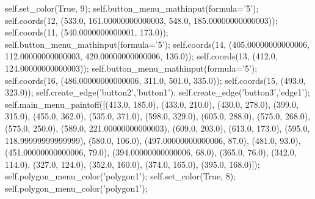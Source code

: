 self.set_color(True, 9);
self.button_menu_mathinput(formula='5');
self.coords(12, (533.0, 161.00000000000003, 548.0, 185.00000000000003));
self.coords(11, (540.0000000000001, 173.0));
self.button_menu_mathinput(formula='5');
self.coords(14, (405.00000000000006, 112.00000000000003, 420.00000000000006, 136.0));
self.coords(13, (412.0, 124.00000000000003));
self.button_menu_mathinput(formula='5');
self.coords(16, (486.00000000000006, 311.0, 501.0, 335.0));
self.coords(15, (493.0, 323.0));
self.create_edge('button2','button1');
self.create_edge('button3','edge1');
self.main_menu_paintoff([(413.0, 185.0), (433.0, 210.0), (430.0, 278.0), (399.0, 315.0), (455.0, 362.0), (535.0, 371.0), (598.0, 329.0), (605.0, 288.0), (575.0, 268.0), (575.0, 250.0), (589.0, 221.00000000000003), (609.0, 203.0), (613.0, 173.0), (595.0, 118.99999999999999), (580.0, 106.0), (497.00000000000006, 87.0), (481.0, 93.0), (451.00000000000006, 79.0), (394.00000000000006, 68.0), (365.0, 76.0), (342.0, 114.0), (327.0, 124.0), (352.0, 160.0), (374.0, 165.0), (395.0, 168.0)]);
self.polygon_menu_color('polygon1');
self.set_color(True, 8);
self.polygon_menu_color('polygon1');

